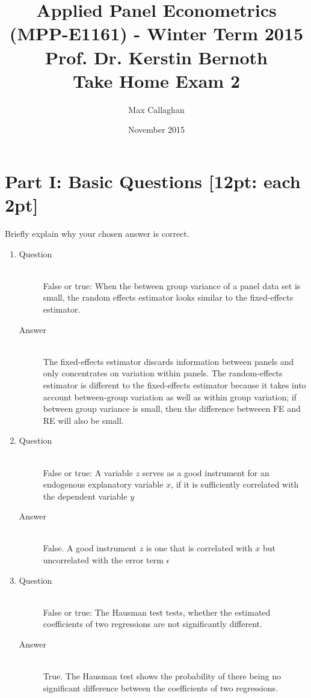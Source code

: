 \documentclass{article}
\begin{document}
\title{\small Applied Panel Econometrics (MPP-E1161) - Winter Term 2015 \\ Prof. Dr. Kerstin Bernoth \\ \bigskip \Large Take Home Exam 2}
\author{Max Callaghan}
\date{November 2015}
\maketitle

\section{Part I: Basic Questions [12pt: each 2pt]}
Briefly explain why your chosen answer is correct.
\begin{enumerate}
  \item
  \begin{description}
    \item[Question] \hfill \\
    False or true: When the between group variance of a panel data set is small, the random effects estimator looks similar to the fixed-effects estimator.
    \item[Answer] \hfill \\
    The fixed-effects estimator discards information between panels and only concentrates on variation within panels. The random-effects estimator is different to the fixed-effects estimator because it takes into account between-group variation as well as within group variation; if between group variance is small, then the difference betweeen FE and RE will also be small. 
    
  \end{description}
  
  \item
  \begin{description}
    \item[Question] \hfill \\
    False or true: A variable \(z\) serves as a good instrument for an endogenous explanatory variable \(x\), if it is sufficiently correlated with the dependent variable \(y\)
    \item[Answer] \hfill \\
    False. A good instrument \(z\) is one that is correlated with \(x\) but uncorrelated with the error term \(\epsilon\)
    
  \end{description}
  
  \item
  \begin{description}
    \item[Question] \hfill \\
    False or true: The Hausman test tests, whether the estimated coefficients of two regressions are not significantly different.
    \item[Answer] \hfill \\
    True. The Hausman test shows the probability of there being no significant difference between the coefficients of two regressions.
  \end{description}
  

\end{enumerate}
\end{document}
